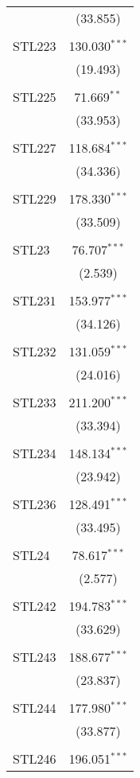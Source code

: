 \begin{table}[!htbp]
\begin{tabular}{@{\extracolsep{5pt}}lc}
  & (33.855) \\ 
  & \\ 
 STL223 & 130.030$^{***}$ \\ 
  & (19.493) \\ 
  & \\ 
 STL225 & 71.669$^{**}$ \\ 
  & (33.953) \\ 
  & \\ 
 STL227 & 118.684$^{***}$ \\ 
  & (34.336) \\ 
  & \\ 
 STL229 & 178.330$^{***}$ \\ 
  & (33.509) \\ 
  & \\ 
 STL23 & 76.707$^{***}$ \\ 
  & (2.539) \\ 
  & \\ 
 STL231 & 153.977$^{***}$ \\ 
  & (34.126) \\ 
  & \\ 
 STL232 & 131.059$^{***}$ \\ 
  & (24.016) \\ 
  & \\ 
 STL233 & 211.200$^{***}$ \\ 
  & (33.394) \\ 
  & \\ 
 STL234 & 148.134$^{***}$ \\ 
  & (23.942) \\ 
  & \\ 
 STL236 & 128.491$^{***}$ \\ 
  & (33.495) \\ 
  & \\ 
 STL24 & 78.617$^{***}$ \\ 
  & (2.577) \\ 
  & \\ 
 STL242 & 194.783$^{***}$ \\ 
  & (33.629) \\ 
  & \\ 
 STL243 & 188.677$^{***}$ \\ 
  & (23.837) \\ 
  & \\ 
 STL244 & 177.980$^{***}$ \\ 
  & (33.877) \\ 
  & \\ 
 STL246 & 196.051$^{***}$ \\ 

\end{tabular}
\end{table}
